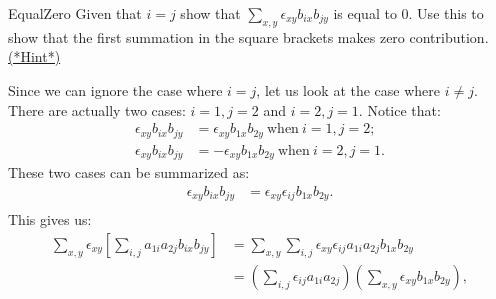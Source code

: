 \begin{exercise}{EqualZero}
Given that $i=j$ show that $\sum_{x,y} \epsilon_{xy}  b_{ix}b_{jy}$  is equal to 0. Use this to show that the first summation in the square brackets makes zero contribution. \hyperref[sec:sigma:hints]{(*Hint*)} 
\end{exercise}
Since we can ignore the case where $i=j$, let us look at the case where $i \neq j$.  There are actually two cases: $i=1, j=2$ and $i=2, j=1$.  Notice that:
\begin{align*}
 \epsilon_{xy} b_{ix}b_{jy}&=\epsilon_{xy} b_{1x}b_{2y}~\text{when}~i=1,j=2;\\
 \epsilon_{xy} b_{ix}b_{jy}&= -\epsilon_{xy} b_{1x}b_{2y}~\text{when}~i=2,j=1.
\end{align*}
These two cases can be summarized as:
\begin{align*}
 \epsilon_{xy} b_{ix}b_{jy}&=\epsilon_{xy}\epsilon_{ij} b_{1x}b_{2y}.\\
\end{align*}
This gives us:
\begin{align*}
\sum_{x,y} \epsilon_{xy} \left[ \sum_{i,j}  a_{1i}a_{2j} b_{ix}b_{jy}\right]&= \sum_{x,y}  \sum_{i,j} \epsilon_{xy}\epsilon_{ij}   a_{1i}a_{2j} b_{1x}b_{2y}\\
&=  \left(\sum_{i,j}\epsilon_{ij}   a_{1i}a_{2j}\right)\left(\sum_{x,y}  \epsilon_{xy} b_{1x}b_{2y}\right),
\end{align*}

